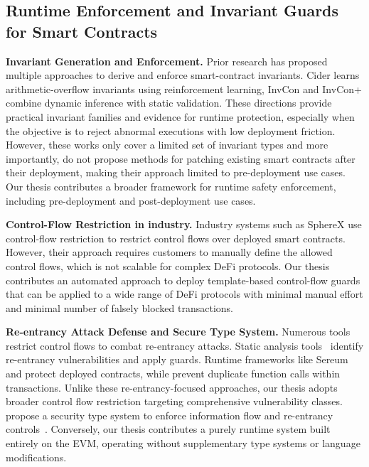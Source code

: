 \subsection{Runtime Enforcement and Invariant Guards for Smart Contracts}

\noindent \textbf{Invariant Generation and Enforcement.}
Prior research has proposed multiple approaches to 
derive and enforce smart-contract invariants.
Cider\cite{liu2022learning} learns arithmetic-overflow invariants 
using reinforcement learning,
InvCon and InvCon+\cite{liu2022invcon,liu2024automated} combine 
dynamic inference with static validation. 
These directions provide practical invariant families 
and evidence for runtime protection,
especially when the objective is to reject abnormal executions 
with low deployment friction. However, 
these works only cover a limited set of invariant types and 
more importantly, do not propose methods for 
patching existing smart contracts after their deployment, 
making their approach limited to pre-deployment use cases. 
Our thesis contributes a broader framework for runtime safety enforcement,
including pre-deployment and post-deployment use cases.


\noindent \textbf{Control-Flow Restriction in industry.}
Industry systems such as SphereX use control-flow 
restriction to restrict control flows over deployed smart contracts\cite{spherex}.
However, their approach requires 
customers to manually define the allowed control flows, 
which is not scalable for complex DeFi protocols. Our thesis 
contributes an automated approach 
to deploy template-based control-flow guards that can be applied 
to a wide range of DeFi protocols with minimal manual effort and minimal 
number of falsely blocked transactions.




\noindent
\textbf{Re-entrancy Attack Defense and Secure Type System.}
Numerous tools restrict control flows to combat re-entrancy attacks. 
Static analysis tools~\cite{luu2016making,torres2018osiris,
liu2018reguard,feist2019slither,
zhang2019mpro,bose2022sailfish,ma2021pluto,zheng2022park,wang2024efficiently,
albert2020taming} identify re-entrancy vulnerabilities and apply guards. 
Runtime frameworks like Sereum~\cite{rodler2018sereum} and 
\citeauthor{grossman2017online} protect deployed contracts, 
while \citeauthor{callens2024temporarily} prevent duplicate 
function calls within transactions. Unlike these 
re-entrancy-focused approaches, our thesis adopts broader 
control flow restriction targeting comprehensive vulnerability classes.
\citeauthor{cecchetti2020securing} propose a security type system to 
enforce information flow and re-entrancy controls~\cite{cecchetti2020securing,
cecchetti2021compositional}. Conversely, 
our thesis contributes a purely runtime system built entirely on the EVM, 
operating without supplementary type systems or language modifications.


